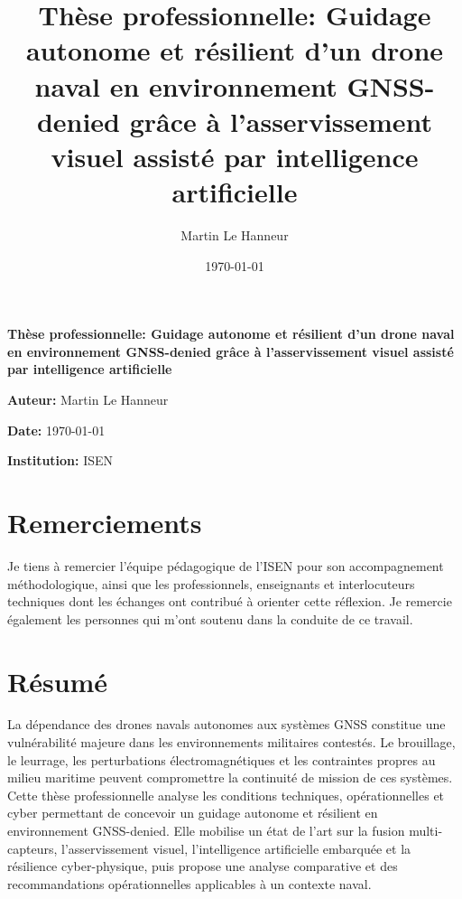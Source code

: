 \documentclass[12pt, a4paper, twoside, openright]{report}
\title{Thèse professionnelle: Guidage autonome et résilient d’un drone naval en environnement GNSS-denied grâce à l’asservissement visuel assisté par intelligence artificielle}
\author{Martin Le Hanneur}
\date{\today}
\begin{document}
\begin{titlepage}
    \begin{center}
        {\Huge \textbf{Thèse professionnelle: Guidage autonome et résilient d’un drone naval en environnement GNSS-denied grâce à l’asservissement visuel assisté par intelligence artificielle} \par}
        {\Large \textbf{Auteur:} Martin Le Hanneur \par}
        {\large \textbf{Date:} \today \par}    
        {\large \textbf{Institution:} ISEN \par}
        \vfill
    \end{center}
\end{titlepage}

\cleardoublepage%
\chapter*{Remerciements}
Je tiens à remercier l’équipe pédagogique de l’ISEN pour son accompagnement méthodologique, ainsi que les professionnels, enseignants et interlocuteurs techniques dont les échanges ont contribué à orienter cette réflexion. Je remercie également les personnes qui m’ont soutenu dans la conduite de ce travail.

\cleardoublepage%
\chapter*{Résumé}
La dépendance des drones navals autonomes aux systèmes GNSS constitue une vulnérabilité majeure dans les environnements militaires contestés. Le brouillage, le leurrage, les perturbations électromagnétiques et les contraintes propres au milieu maritime peuvent compromettre la continuité de mission de ces systèmes. Cette thèse professionnelle analyse les conditions techniques, opérationnelles et cyber permettant de concevoir un guidage autonome et résilient en environnement GNSS-denied. Elle mobilise un état de l’art sur la fusion multi-capteurs, l’asservissement visuel, l’intelligence artificielle embarquée et la résilience cyber-physique, puis propose une analyse comparative et des recommandations opérationnelles applicables à un contexte naval.

\cleardoublepage%
\tableofcontents
\cleardoublepage%
\listoffigures
\cleardoublepage%
\listoftables
\cleardoublepage%
\end{document}
